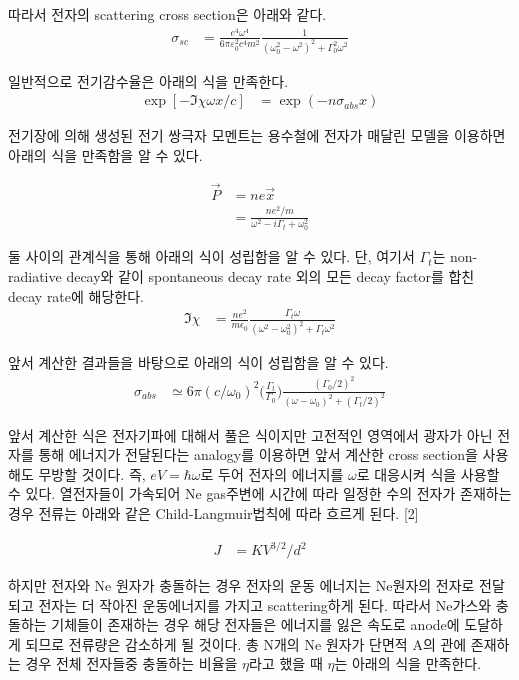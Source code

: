 \documentclass[%
 reprint,
 amsmath,amssymb,
 aps,
]{revtex4-2}
\begin{document}
따라서 전자의 scattering cross section은 아래와 같다.
\begin{align}
	\sigma_{sc} &= \frac{e^{4}\omega^{4}}{6\pi\varepsilon_{0}^{2}c^{4}m^{2}} \frac{1}{(\omega_{0}^{2}-\omega^{2})^{2}+\Gamma_{0}^{2}\omega^{2}}
\end{align}

일반적으로 전기감수율은 아래의 식을 만족한다. 
\begin{align}
	\exp[-\Im \chi \omega x /c ] &= \exp(-n\sigma_{abs}x)
\end{align}

전기장에 의해 생성된 전기 쌍극자 모멘트는 용수철에 전자가 매달린 모델을 이용하면 아래의 식을 만족함을 알 수 있다.

\begin{align}
	\vec{P} &= ne\vec{x}\\
	&= \frac{ne^{2}/m}{\omega^{2}-i\Gamma_{t}+\omega_{0}^{2}}
\end{align}

둘 사이의 관계식을 통해 아래의 식이 성립함을 알 수 있다. 단, 여기서 $\Gamma_{t}$는 non-radiative decay와 같이 spontaneous decay rate 외의 모든 decay factor를 합친 decay rate에 해당한다. 
\begin{align}
	\Im \chi &= \frac{ne^{2}}{m\epsilon_{0}} \frac{\Gamma_{t}\omega}{(\omega^{2}-\omega_{0}^{2})^{2} + \Gamma_{t}\omega^{2}}
\end{align}

앞서 계산한 결과들을 바탕으로 아래의 식이 성립함을 알 수 있다.
\begin{align}
	\sigma_{abs} &\simeq 6\pi (c/\omega_{0})^{2}\Bigg(\frac{\Gamma_{t}}{\Gamma_{0}}\Bigg)\frac{(\Gamma_{0}/2)^{2}}{(\omega-\omega_{0})^{2}+(\Gamma_{t}/2)^{2}}
\end{align}

앞서 계산한 식은 전자기파에 대해서 풀은 식이지만 고전적인 영역에서 광자가 아닌 전자를 통해 에너지가 전달된다는 analogy를 이용하면 앞서 계산한 cross section을 사용해도 무방할 것이다. 즉, $eV = \hbar \omega$로 두어 전자의 에너지를 $\omega$로 대응시켜 식을 사용할 수 있다. 열전자들이 가속되어 Ne gas주변에 시간에 따라 일정한 수의 전자가 존재하는 경우 전류는 아래와 같은 Child-Langmuir법칙에 따라 흐르게 된다. [2]

\begin{align}
	J &= KV^{3/2}/d^{2}
\end{align}

하지만 전자와 Ne 원자가 충돌하는 경우 전자의 운동 에너지는 Ne원자의 전자로 전달되고 전자는 더 작아진 운동에너지를 가지고 scattering하게 된다.  따라서 Ne가스와 충돌하는 기체들이 존재하는 경우 해당 전자들은 에너지를 잃은 속도로 anode에 도달하게 되므로 전류량은 감소하게 될 것이다. 총 N개의 Ne 원자가 단면적 A의 관에 존재하는 경우 전체 전자들중 충돌하는 비율을 $\eta$라고 했을 때 $\eta$는 아래의 식을 만족한다.
\end{document}
